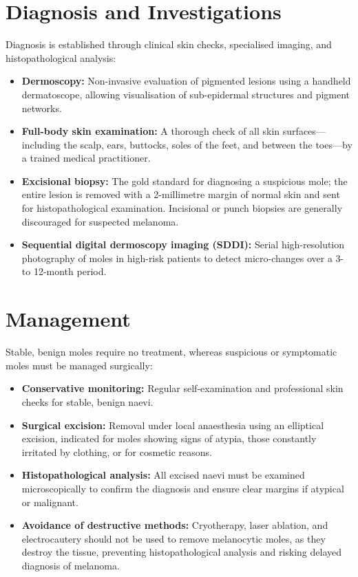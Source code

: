 \section*{Diagnosis and Investigations}
Diagnosis is established through clinical skin checks, specialised imaging, and histopathological analysis:
\begin{itemize}
    \item \textbf{Dermoscopy:} Non-invasive evaluation of pigmented lesions using a handheld dermatoscope, allowing visualisation of sub-epidermal structures and pigment networks.
    \item \textbf{Full-body skin examination:} A thorough check of all skin surfaces—including the scalp, ears, buttocks, soles of the feet, and between the toes—by a trained medical practitioner.
    \item \textbf{Excisional biopsy:} The gold standard for diagnosing a suspicious mole; the entire lesion is removed with a 2-millimetre margin of normal skin and sent for histopathological examination. Incisional or punch biopsies are generally discouraged for suspected melanoma.
    \item \textbf{Sequential digital dermoscopy imaging (SDDI):} Serial high-resolution photography of moles in high-risk patients to detect micro-changes over a 3- to 12-month period.
\end{itemize}

\section*{Management}
Stable, benign moles require no treatment, whereas suspicious or symptomatic moles must be managed surgically:
\begin{itemize}
    \item \textbf{Conservative monitoring:} Regular self-examination and professional skin checks for stable, benign naevi.
    \item \textbf{Surgical excision:} Removal under local anaesthesia using an elliptical excision, indicated for moles showing signs of atypia, those constantly irritated by clothing, or for cosmetic reasons.
    \item \textbf{Histopathological analysis:} All excised naevi must be examined microscopically to confirm the diagnosis and ensure clear margins if atypical or malignant.
    \item \textbf{Avoidance of destructive methods:} Cryotherapy, laser ablation, and electrocautery should not be used to remove melanocytic moles, as they destroy the tissue, preventing histopathological analysis and risking delayed diagnosis of melanoma.
\end{itemize}

